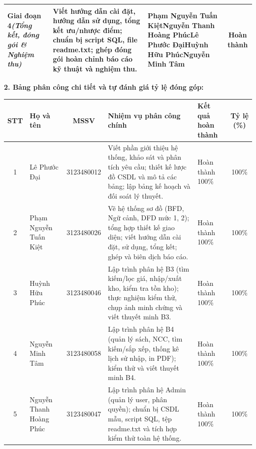 \documentclass[12pt,a4paper]{article}
\begin{document}
\begin{table}[h!]
\begin{tabularx}{\textwidth}{|>{\raggedright\arraybackslash}p{2.8cm}|>{\raggedright\arraybackslash}X|>{\raggedright\arraybackslash}p{3.2cm}|c|}
\hline
\textbf{Giai đoạn 4}\newline\textit{(Tổng kết, đóng gói \& Nghiệm thu)} & Viết hướng dẫn cài đặt, hướng dẫn sử dụng, tổng kết ưu/nhược điểm; chuẩn bị script SQL, file readme.txt; ghép đóng gói hoàn chỉnh báo cáo kỹ thuật và nghiệm thu. & Phạm Nguyễn Tuấn Kiệt\newline Nguyễn Thanh Hoàng Phúc\newline Lê Phước Đại\newline Huỳnh Hữu Phúc\newline Nguyễn Minh Tâm & Hoàn thành \\
\hline
\end{tabularx}
\end{table}

\vspace{0.4cm}
\noindent\textbf{2. Bảng phân công chi tiết và tự đánh giá tỷ lệ đóng góp:}

\vspace{0.2cm}
\noindent
\begin{table}[h!]
\centering
\small
\renewcommand{\arraystretch}{1.25}
\begin{tabularx}{\textwidth}{|c|>{\raggedright\arraybackslash}p{3.0cm}|c|>{\raggedright\arraybackslash}X|>{\centering\arraybackslash}p{1.8cm}|c|}
\hline
\textbf{STT} & \textbf{Họ và tên} & \textbf{MSSV} & \textbf{Nhiệm vụ phân công chính} & \textbf{Kết quả hoàn thành} & \textbf{Tỷ lệ (\%)} \\
\hline
1 & Lê Phước Đại & 3123480012 & Viết phần giới thiệu hệ thống, khảo sát và phân tích yêu cầu; thiết kế lược đồ CSDL và mô tả các bảng; lập bảng kế hoạch và đối soát lý thuyết. & Hoàn thành 100\% & 100\% \\
\hline
2 & Phạm Nguyễn Tuấn Kiệt & 3123480026 & Vẽ hệ thống sơ đồ (BFD, Ngữ cảnh, DFD mức 1, 2); tổng hợp thiết kế giao diện; viết hướng dẫn cài đặt, sử dụng, tổng kết; ghép và biên dịch báo cáo. & Hoàn thành 100\% & 100\% \\
\hline
3 & Huỳnh Hữu Phúc & 3123480046 & Lập trình phân hệ B3 (tìm kiếm/lọc giá, nhập/xuất kho, kiểm tra tồn kho); thực nghiệm kiểm thử, chụp ảnh minh chứng và viết thuyết minh B3. & Hoàn thành 100\% & 100\% \\
\hline
4 & Nguyễn Minh Tâm & 3123480058 & Lập trình phân hệ B4 (quản lý sách, NCC, tìm kiếm/sắp xếp, thống kê lịch sử nhập, in PDF); kiểm thử và viết thuyết minh B4. & Hoàn thành 100\% & 100\% \\
\hline
5 & Nguyễn Thanh Hoàng Phúc & 3123480047 & Lập trình phân hệ Admin (quản lý user, phân quyền); chuẩn bị CSDL mẫu, script SQL, tệp readme.txt và tích hợp kiểm thử toàn hệ thống. & Hoàn thành 100\% & 100\% \\
\hline
\end{tabularx}
\end{table}
\end{document}
